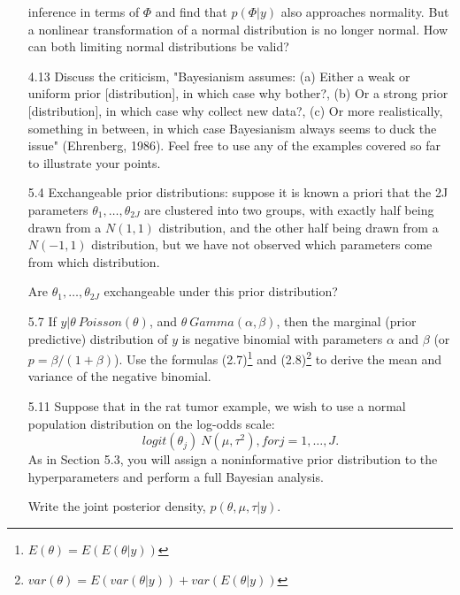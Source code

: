 \documentclass[12pt,a4paper,twoside]{article}
\begin{document}
\begin{enumerate}
    inference in terms of $\Phi$ and find that $p(\Phi|y)$ also approaches normality. But a nonlinear transformation of a normal distribution is no
    longer normal. How can both limiting normal distributions be valid?
    \item[4.13]\cite{Chapter4Exercises} Discuss the criticism, "Bayesianism assumes: (a) Either a weak or uniform prior [distribution], in which case
    why bother?, (b) Or a strong prior [distribution], in which case why collect new data?, (c) Or more realistically, something in between, in which
    case Bayesianism always seems to duck the issue" (Ehrenberg, 1986). Feel free to use any of the examples covered so far to illustrate your points.
    \item[5.4]\cite{Chapter5Exercises} Exchangeable prior distributions: suppose it is known a priori that the 2J parameters $\theta_1,\dots, \theta_{2J}$
    are clustered into two groups, with exactly half being drawn from a $N(1, 1)$ distribution, and the other half being drawn from a $N(-1, 1)$
    distribution, but we have not observed which parameters come from which distribution.
    
    Are $\theta_1,\dots, \theta_{2J}$ exchangeable under this prior distribution?
    \item[5.7]\cite{Chapter5Exercises} If $y|\theta ~ Poisson(\theta)$, and $\theta ~ Gamma(\alpha, \beta)$, then the marginal (prior predictive)
    distribution of $y$ is negative binomial with parameters $\alpha$ and $\beta$ (or $p = \beta/(1 + \beta)$). Use the formulas (2.7)\footnote{$E
    (\theta) = E (E (\theta|y))$}
    and (2.8)\footnote{$var(\theta) = E (var (\theta|y)) + var (E (\theta|y))$} to derive the mean and variance of the negative binomial.
    \item[5.11]\cite{Chapter5Exercises} Suppose that in the rat tumor example, we wish to use a normal population distribution on the log-odds
    scale:
    \[
    logit(\theta_j ) ~ N(\mu, \tau^2),for j = 1,\dots, J.
    \]
    As in Section 5.3, you will assign a noninformative prior distribution to the hyperparameters and perform a full Bayesian analysis.
    
    Write the joint posterior density, $p(\theta, \mu, \tau|y)$. 
\end{enumerate}

\newpage



\end{document}
